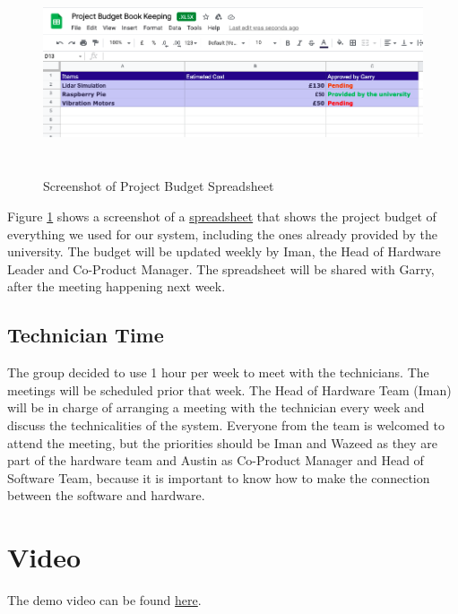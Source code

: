 \documentclass{article}
\begin{document}
\begin{figure}[hp!]
\begin{center}
  \includegraphics[width=1\textwidth,height=6cm]{cost.png}
  \caption{Screenshot of Project Budget Spreadsheet}
  \label{figure 3}
   \end{center}
\end{figure}

Figure \ref{figure 3} shows a screenshot of a \href{https://docs.google.com/spreadsheets/d/1f9Xxwo_f1lgzSphoT1upxFMg0Z1Rc181/edit#gid=1746507455}{spreadsheet} that shows the project budget of everything we used for our system, including the ones already provided by the university. The budget will be updated weekly by Iman, the Head of Hardware Leader and Co-Product Manager. The spreadsheet will be shared with Garry, after the meeting happening next week. 


\subsection{Technician Time }
The group decided to use 1 hour per week to meet with the technicians. The meetings will be scheduled prior that week. The Head of Hardware Team (Iman) will be in charge of arranging a meeting with the technician every week and discuss the technicalities of the system. Everyone from the team is welcomed to attend the meeting, but the priorities should be Iman and Wazeed as they are part of the hardware team and Austin as Co-Product Manager and Head of Software Team, because it is important to know how to make the connection between the software and hardware. 

\section{Video}
The demo video can be found  \href{https://uoe.sharepoint.com/:v:/s/SDP2021-Group-18_/EVqoBITskpBPu1HTftugXQsBEp29XuYYGY-UFZv7lIEHww?e=iEbhEi}{here}.


\end{document}
